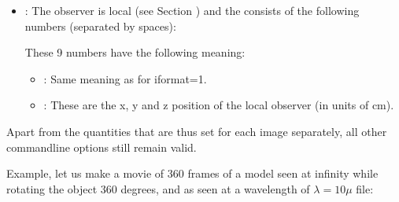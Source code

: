 \documentclass[letterpaper,10pt,english]{sphinxmanual}
\begin{document}
\begin{itemize}
\begin{itemize}
\end{itemize}

\item {} 
:
The observer is local (see Section
{\hyperref[\detokenize{imagesspectra:sec-local-observer}]{}}) and the  consists of the following numbers (separated by spaces):

\begin{sphinxVerbatim}[commandchars=\\\{\}]
        
\end{sphinxVerbatim}

These 9 numbers have the following meaning:
\begin{itemize}
\item {} 
:
Same meaning as for iformat=1.

\item {} 
:
These are the x, y and z position of the local observer (in units of cm).

\end{itemize}

\end{itemize}

Apart from the quantities that are thus set for each image separately, all other
command\sphinxhyphen{}line options still remain valid.

Example, let us make a movie of 360 frames of a model seen at infinity while
rotating the object 360 degrees, and as seen at a wavelength of
\(\lambda=10\mu\) file:

\begin{sphinxVerbatim}[commandchars=\\\{\}]
        
        
        
        
        
        
\end{sphinxVerbatim}
\end{document}
